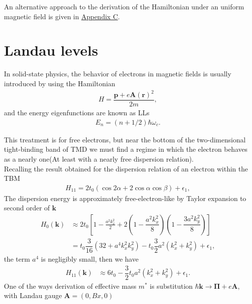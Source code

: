 \documentclass{report}
\newcommand{\f}[2]{\dfrac{#1}{#2}}
\begin{document}
An alternative approach to the derivation of the Hamiltonian under an uniform magnetic field is given in \hyperref[appendix C]{Appendix C}.
\newpage
\section{Landau levels}
In solid-state physics, the behavior of electrons in magnetic fields is usually introduced by using the Hamiltonian
\begin{gather}
	H = \f{\mathbf{p} + e \mathbf{A}(\mathbf{r})^{2}}{2m} ,
\end{gather}
and the energy eigenfunctions are known as \ac{LLs}
\begin{gather}
	E_{n} = \left(n + 1/2\right) \hbar \omega_{c}.
\end{gather}

This treatment is for free electrons, but near the bottom of the two-dimensional tight-binding band of \ac{TMD} we must find a regime in which the electron behaves as a nearly one(At least with a nearly free dispersion relation). \\
Recalling the result obtained for the dispersion relation of an electron within the \ac{TBM}
\begin{gather}
	H_{11} = 2 t_{0} (\cos 2\alpha + 2 \cos \alpha \cos \beta) + \epsilon_{1},
\end{gather}
The dispersion energy is approximately free-electron-like by Taylor expansion to second order of $\mathbf{k}$
\begin{equation}
	\begin{aligned}
		H_{0}(\mathbf{k})
		 & \approx 2 t_{0} \left[1 - \frac{a^{2} k_{x}^{2}}{2} + 2\left(1 - \f{a^{2} k_{x}^{2}}{8}\right)\left(1 - \f{3a^{2} k_{y}^{2}}{8}\right)\right] \\
		 & = t_{0} \f{3}{16} \left(32 + a^{4} k_{x}^{2} k_{y}^{2}\right) - t_{0} \f{3}{2} a^{2}\left(k_{x}^{2} + k_{y}^{2}\right) + \epsilon_{1} ,
	\end{aligned}
\end{equation}
the term $a^{4}$ is negligibly small, then we have
\begin{equation}
	\begin{aligned}
		H_{11}(\mathbf{k})
		 & \approx 6 t_{0} - \f{3}{2} t_{0} a^{2} (k_{x}^{2} + k_{y}^{2}) + \epsilon_{1}.
	\end{aligned}
\end{equation}
One of the ways derivation of effective mass $m^{*}$ is substitution $\hbar\mathbf{k} \rightarrow \mathbf{\Pi} + e \mathbf{A}$, with Landau gauge $\mathbf{A} = (0,Bx,0)$
\end{document}
